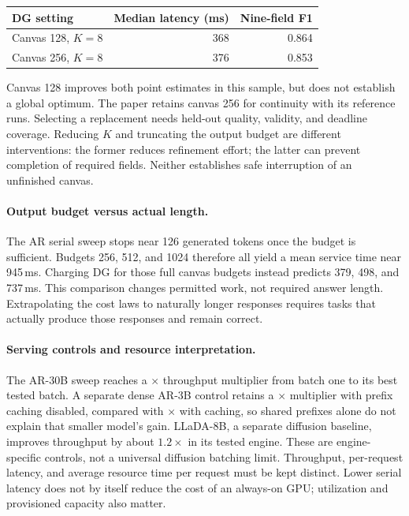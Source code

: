 \begin{center}
\begin{tabular}{@{}lrr@{}}
\toprule
DG setting & Median latency (ms) & Nine-field F1 \\
\midrule
Canvas 128, $K=8$ & 368 & 0.864 \\
Canvas 256, $K=8$ & 376 & 0.853 \\
\bottomrule
\end{tabular}
\end{center}

Canvas 128 improves both point estimates in this sample, but does not
establish a global optimum. The paper retains canvas 256 for continuity
with its reference runs. Selecting a replacement needs held-out quality,
validity, and deadline coverage. Reducing $K$ and truncating the output
budget are different interventions: the former reduces refinement effort;
the latter can prevent completion of required fields. Neither establishes
safe interruption of an unfinished canvas.

\paragraph{Output budget versus actual length.}
The AR serial sweep stops near 126 generated tokens once the budget is
sufficient. Budgets 256, 512, and 1024 therefore all yield a mean service
time near 945\,ms. Charging DG for those full canvas budgets instead predicts
379, 498, and 737\,ms. This comparison changes permitted work, not required
answer length. Extrapolating the cost laws to naturally longer responses
requires tasks that actually produce those responses and remain correct.

\paragraph{Serving controls and resource interpretation.}
The AR-30B sweep reaches a \arBatchMult$\times$ throughput multiplier
from batch one to its best tested batch. A separate dense AR-3B control
retains a \cacheOffMult$\times$ multiplier with prefix caching disabled,
compared with \cacheOnMult$\times$ with caching, so shared prefixes alone
do not explain that smaller model's gain. LLaDA-8B, a separate diffusion
baseline, improves throughput by about $1.2\times$ in its tested engine.
These are engine-specific controls, not a universal diffusion batching limit.
Throughput, per-request latency, and average resource time per request must
be kept distinct. Lower serial latency does not by itself reduce the cost
of an always-on GPU; utilization and provisioned capacity also matter.

